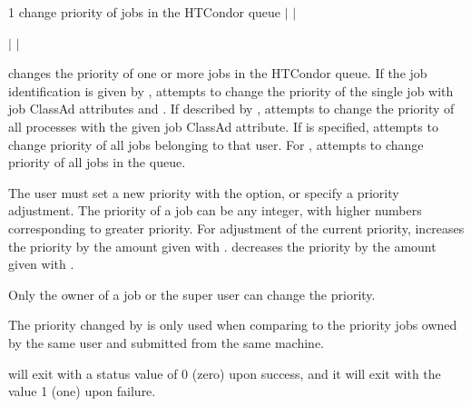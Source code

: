 \begin{ManPage}{\label{man-condor-prio}}{1}
{change priority of jobs in the HTCondor queue} 
\Synopsis {}
 $|$  $|$ 

 $|$  $|$ 
\Lbr {}   \Rbr
{}


\Description

 changes the priority of one or more jobs in the HTCondor queue.
If the job identification is given by ,
 attempts to change the priority of the single job
with job ClassAd attributes  and .
If described by ,
 attempts to change the priority of all processes with the
given  job ClassAd attribute.
If  is specified,  attempts to change priority
of all jobs belonging to that user.
For ,  attempts to change priority of
all jobs in the queue.

The user must set a new priority with the  option,
or specify a priority adjustment. 
The priority of a job can be any integer, with higher numbers
corresponding to greater priority.
For adjustment of the current priority,
 increases the priority by the amount given with .
 decreases the priority by the amount given with .

Only the owner of a job or the super user can change the priority.

The priority changed by  is only used when
comparing to the priority
jobs owned by the same user and submitted from the same machine.

\begin{Options}
\end{Options}

\ExitStatus

 will exit with a status value of 0 (zero) upon success,
and it will exit with the value 1 (one) upon failure.

\end{ManPage}
